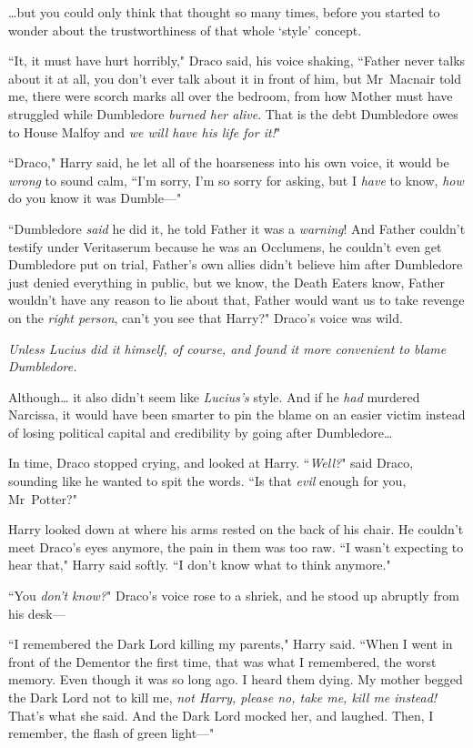 {\ldots}but you could only think that thought so many times, before you started to wonder about the trustworthiness of that whole `style' concept.

``It, it must have hurt horribly," Draco said, his voice shaking, ``Father never talks about it at all, you don't ever talk about it in front of him, but Mr~Macnair told me, there were scorch marks all over the bedroom, from how Mother must have struggled while Dumbledore \emph{burned her alive}. That is the debt Dumbledore owes to House Malfoy and \emph{we will have his life for it!}"

``Draco," Harry said, he let all of the hoarseness into his own voice, it would be \emph{wrong} to sound calm, ``I'm sorry, I'm so sorry for asking, but I \emph{have} to know, \emph{how} do you know it was Dumble—"

``Dumbledore \emph{said} he did it, he told Father it was a \emph{warning}! And Father couldn't testify under Veritaserum because he was an Occlumens, he couldn't even get Dumbledore put on trial, Father's own allies didn't believe him after Dumbledore just denied everything in public, but we know, the Death Eaters know, Father wouldn't have any reason to lie about that, Father would want us to take revenge on the \emph{right person}, can't you see that Harry?" Draco's voice was wild.

\emph{Unless Lucius did it himself, of course, and found it more convenient to blame Dumbledore.}

Although{\ldots} it also didn't seem like \emph{Lucius's} style. And if he \emph{had} murdered Narcissa, it would have been smarter to pin the blame on an easier victim instead of losing political capital and credibility by going after Dumbledore{\ldots}

In time, Draco stopped crying, and looked at Harry. ``\emph{Well?}" said Draco, sounding like he wanted to spit the words. ``Is that \emph{evil} enough for you, Mr~Potter?"

Harry looked down at where his arms rested on the back of his chair. He couldn't meet Draco's eyes anymore, the pain in them was too raw. ``I wasn't expecting to hear that," Harry said softly. ``I don't know what to think anymore."

``You \emph{don't know?}" Draco's voice rose to a shriek, and he stood up abruptly from his desk—

``I remembered the Dark Lord killing my parents," Harry said. ``When I went in front of the Dementor the first time, that was what I remembered, the worst memory. Even though it was so long ago. I heard them dying. My mother begged the Dark Lord not to kill me, \emph{not Harry, please no, take me, kill me instead!} That's what she said. And the Dark Lord mocked her, and laughed. Then, I remember, the flash of green light—"

